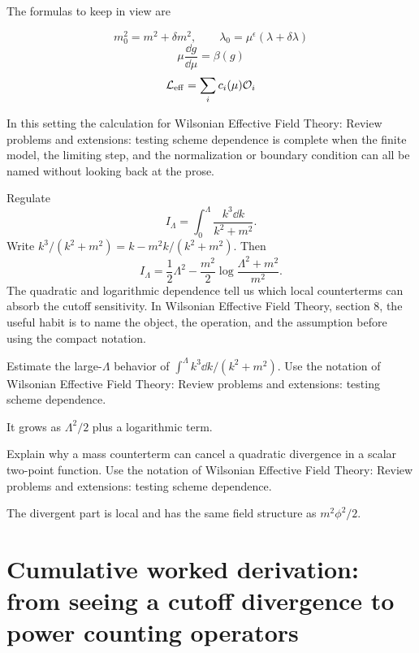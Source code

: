 The formulas to keep in view are

\[
  m_0^2=m^2+\delta m^2,\qquad \lambda_0=\mu^\epsilon(\lambda+\delta\lambda)
\]
\[
  \mu\frac{\dd g}{\dd\mu}=\beta(g)
\]
\[
  \mathcal L_{\mathrm{eff}}=\sum_i c_i(\mu)\mathcal O_i
\]

In this setting the calculation for Wilsonian Effective Field Theory: Review problems and extensions: testing scheme dependence is complete when the finite model, the limiting step, and the normalization or boundary condition can all be named without looking back at the prose.




\begin{example}
Regulate
\[
  I_\Lambda=\int_0^\Lambda\frac{k^3\dd k}{k^2+m^2}.
\]
Write \(k^3/(k^2+m^2)=k-m^2k/(k^2+m^2)\).  Then
\[
  I_\Lambda=\frac12\Lambda^2-\frac{m^2}{2}\log\frac{\Lambda^2+m^2}{m^2}.
\]
The quadratic and logarithmic dependence tell us which local counterterms can absorb the cutoff sensitivity.  In Wilsonian Effective Field Theory, section 8, the useful habit is to name the object, the operation, and the assumption before using the compact notation.
\end{example}



\begin{exercise}
Estimate the large-\(\Lambda\) behavior of \(\int^\Lambda k^3\dd k/(k^2+m^2)\).  Use the notation of Wilsonian Effective Field Theory: Review problems and extensions: testing scheme dependence.
\begin{answer}
It grows as \(\Lambda^2/2\) plus a logarithmic term.
\end{answer}
\end{exercise}

\begin{exercise}
Explain why a mass counterterm can cancel a quadratic divergence in a scalar two-point function.  Use the notation of Wilsonian Effective Field Theory: Review problems and extensions: testing scheme dependence.
\begin{answer}
The divergent part is local and has the same field structure as \(m^2\phi^2/2\).
\end{answer}
\end{exercise}



\section{Cumulative worked derivation: from seeing a cutoff divergence to power counting operators}

